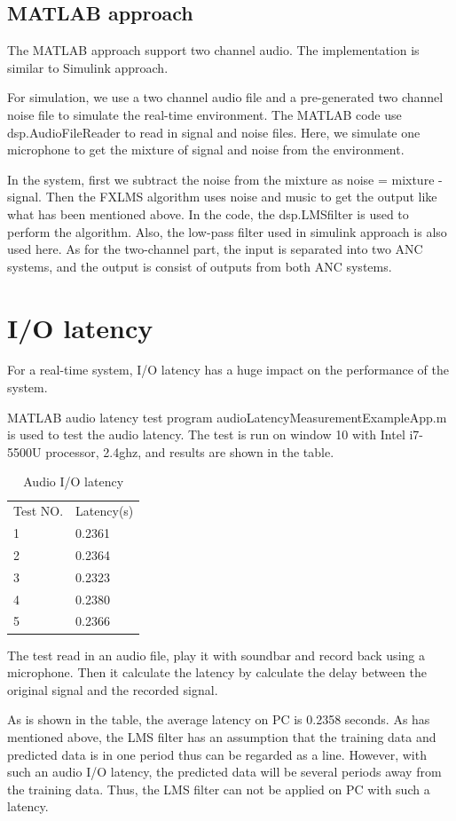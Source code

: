 \documentclass[conference,compsoc]{IEEEtran}
\begin{document}
\subsection{MATLAB approach}
	The MATLAB approach support two channel audio. 
	The implementation is similar to Simulink approach.
\par
	For simulation, 
	we use a two channel audio file and a pre-generated two channel noise file 
	to simulate the real-time environment. 
	The MATLAB code use dsp.AudioFileReader to read in signal and noise files.
	Here, we simulate one microphone to get the mixture of signal and noise from the environment. 
\par
	In the system, first we subtract the noise from the mixture as noise = mixture - signal. 
	Then the FXLMS algorithm uses noise and music to get the output like 
	what has been mentioned above. In the code, the dsp.LMSfilter is used to perform the algorithm.
	Also, the low-pass filter used in simulink approach is also used here.
	As for the two-channel part, 
	the input is separated into two ANC systems, 
	and the output is consist of outputs from both ANC systems.

\section{I/O latency}
For a real-time system, I/O latency has a huge impact on the performance of the system.
\par
MATLAB audio latency test program audioLatencyMeasurementExampleApp.m is used to test the audio latency. The test is run on window 10 with Intel i7-5500U processor, 2.4ghz, and results are shown in the table. 
\par

\begin{table}[]
\centering
\caption{Audio I/O latency}
\label{my-label}
\begin{tabular}{ll}
Test NO. & Latency(s) \\
1        & 0.2361     \\
2        & 0.2364     \\
3        & 0.2323     \\
4        & 0.2380     \\
5        & 0.2366    
\end{tabular}
\end{table}

The test read in an audio file, play it with soundbar and record back using a microphone. Then it calculate the latency by calculate the delay between the original signal and the recorded signal.
\par
As is shown in the table, the average latency on PC is 0.2358 seconds. As has mentioned above, the LMS filter has an assumption that the training data and predicted data is in one period thus can be regarded as a line. However, with such an audio I/O latency, the predicted data will be several periods away from the training data. Thus, the LMS filter can not be applied on PC with such a latency. 
\end{document}
